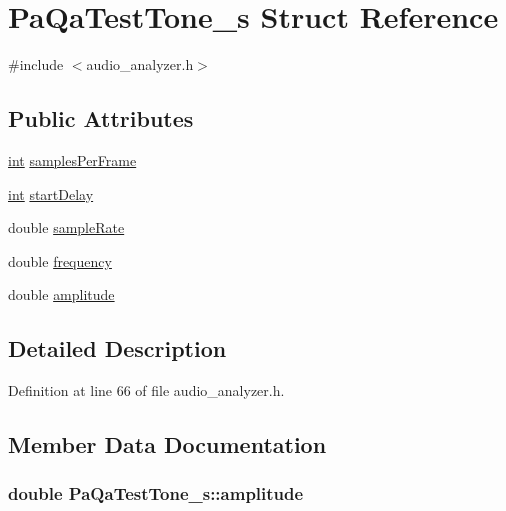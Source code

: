 \hypertarget{struct_pa_qa_test_tone__s}{}\section{Pa\+Qa\+Test\+Tone\+\_\+s Struct Reference}
\label{struct_pa_qa_test_tone__s}


{\ttfamily \#include $<$audio\+\_\+analyzer.\+h$>$}

\subsection*{Public Attributes}
\begin{DoxyCompactItemize}
\item 
\hyperlink{xmltok_8h_a5a0d4a5641ce434f1d23533f2b2e6653}{int} \hyperlink{struct_pa_qa_test_tone__s_a90c802d23c98b9b340772c2bf2c14a84}{samples\+Per\+Frame}
\item 
\hyperlink{xmltok_8h_a5a0d4a5641ce434f1d23533f2b2e6653}{int} \hyperlink{struct_pa_qa_test_tone__s_a094a7dd30970e8def532ac7ea38f6b31}{start\+Delay}
\item 
double \hyperlink{struct_pa_qa_test_tone__s_a204af537989a744626b4aabeb9e2d3a9}{sample\+Rate}
\item 
double \hyperlink{struct_pa_qa_test_tone__s_ab6e6a027870ba348bbce705bf5c196e5}{frequency}
\item 
double \hyperlink{struct_pa_qa_test_tone__s_a94af989158aefe3bd584700022836a55}{amplitude}
\end{DoxyCompactItemize}


\subsection{Detailed Description}


Definition at line 66 of file audio\+\_\+analyzer.\+h.



\subsection{Member Data Documentation}
\subsubsection[{\texorpdfstring{amplitude}{amplitude}}]{\setlength{\rightskip}{0pt plus 5cm}double Pa\+Qa\+Test\+Tone\+\_\+s\+::amplitude}\hypertarget{struct_pa_qa_test_tone__s_a94af989158aefe3bd584700022836a55}{}\label{struct_pa_qa_test_tone__s_a94af989158aefe3bd584700022836a55}



